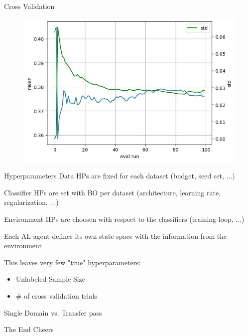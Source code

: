 \documentclass[aspectratio=169, 11pt, invertlogo]{ismll-slides}
\begin{document}
\begin{frame}[fragile]{Cross Validation}
	\begin{figure}
		\centering
		\includegraphics[width=.7\linewidth]{pics/splice_margin100_convergence.jpg}
	\end{figure}
\end{frame}


\begin{frame}[fragile]{Hyperparameters}
	Data HPs are fixed for each dataset (budget, seed set, ...)
	
	Classifier HPs are set with BO per dataset (architecture, learning rate, regularization, ...)
	
	Environment HPs are choosen with respect to the classifiers (training loop, ...)
	
	Each AL agent defines its own state space with the information from the environment
	
	This leaves very few "true" hyperparameters: 
	\begin{itemize}
		\item Unlabeled Sample Size
		\item \# of cross validation trials
	\end{itemize}
\end{frame}


\begin{frame}[fragile]{Single Domain vs. Transfer}
	pass
\end{frame}


\begin{frame}[fragile]{The End}
	Cheers
\end{frame}
\end{document}
